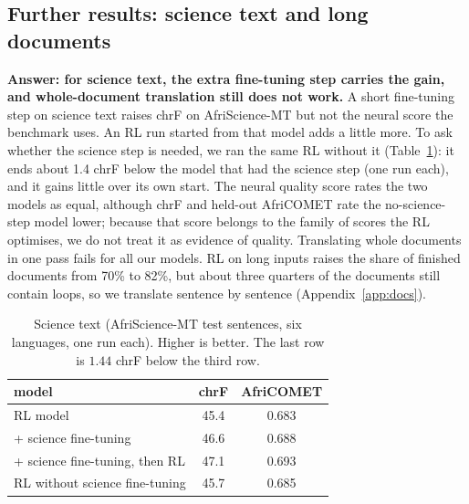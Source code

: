 \subsection{Further results: science text and long documents}\label{sec:science}
\textbf{Answer: for science text, the extra fine-tuning step carries the gain, and whole-document translation still does not work.} A short fine-tuning step on science text raises chrF on AfriScience-MT but not the neural score the benchmark uses. An RL run started from that model adds a little more. To ask whether the science step is needed, we ran the same RL without it (Table~\ref{tab:sci}): it ends about 1.4 chrF below the model that had the science step (one run each), and it gains little over its own start. The neural quality score rates the two models as equal, although chrF and held-out AfriCOMET rate the no-science-step model lower; because that score belongs to the family of scores the RL optimises, we do not treat it as evidence of quality. Translating whole documents in one pass fails for all our models. RL on long inputs raises the share of finished documents from 70\% to 82\%, but about three quarters of the documents still contain loops, so we translate sentence by sentence (Appendix~\ref{app:docs}).

\begin{table}[t]
\centering\footnotesize\setlength{\tabcolsep}{3pt}
\caption{Science text (AfriScience-MT test sentences, six languages, one run each). Higher is better. The last row is $1.44$ chrF  below the third row.}\label{tab:sci}
\begin{tabular}{@{}lcc@{}}
\toprule
model & chrF & AfriCOMET\\
\midrule
RL model & 45.4 & 0.683\\
+ science fine-tuning & 46.6 & 0.688\\
+ science fine-tuning, then RL & 47.1 & 0.693\\
RL without science fine-tuning & 45.7 & 0.685\\
\bottomrule
\end{tabular}
\end{table}
